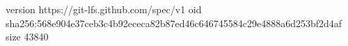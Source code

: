 version https://git-lfs.github.com/spec/v1
oid sha256:568e904e37ceb3c4b92ececa82b87ed46c646745584c29e4888a6d253bf2d4af
size 43840
